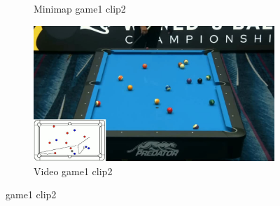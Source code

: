 \begin{figure}[H]
\begin{subfigure}[b]{0.48\textwidth}
    	\caption{Minimap game1 clip2}
    	\label{fig: game1_clip2_minimap}
    \end{subfigure}
    \begin{subfigure}[b]{0.48\textwidth}
    	\centering
    	\includegraphics[width=\textwidth]{images/Video/game1_clip2_video.jpg}
    	\caption{Video game1 clip2}
    	\label{fig: game1_clip2_video}
    \end{subfigure}

	\caption{game1 clip2}
\end{figure}


